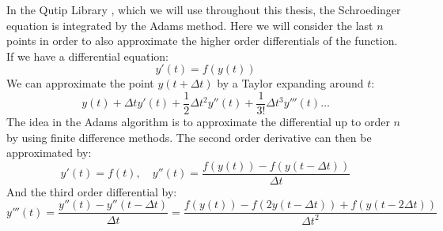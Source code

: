 In the Qutip Library\cite{johansson_qutip_2012} , which we will use throughout this thesis, the Schroedinger equation is integrated by the Adams method. Here we will consider the last $n$ points in order to also approximate the higher order differentials of the function. If we have a differential equation:
\begin{equation}
    y'(t) = f(y(t))
\end{equation}
We can approximate the point $y(t+\Delta t)$ by a Taylor expanding around $t$:
\begin{equation}
    y(t) + \Delta t y'(t) + \frac12 \Delta t^2 y''(t) + \frac{1}{3!} \Delta t^3 y'''(t)\dots 
\end{equation}
The idea in the Adams algorithm is to approximate the differential up to order $n$ by using finite difference methods. The second order derivative can then be approximated by:
\begin{equation}
    y'(t) = f(t), \quad y''(t) = \frac{f(y(t)) - f(y(t - \Delta t))}{\Delta t} 
\end{equation}
And the third order differential by:
\begin{equation}
    y'''(t) = \frac{y''(t) - y''(t-\Delta t)}{\Delta t} = \frac{f(y(t)) - f(2y(t-\Delta t)) + f(y(t-2\Delta t))}{\Delta t^2}
\end{equation}


